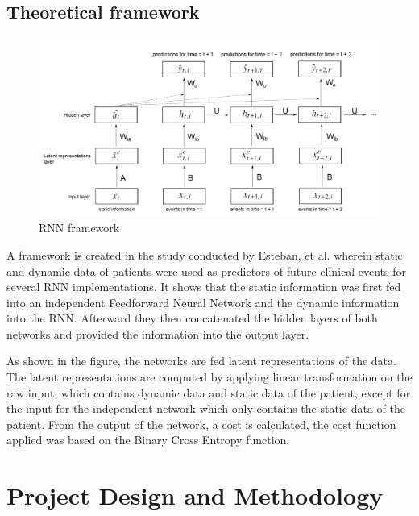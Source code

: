 \documentclass[10pt,11pt,12pt,oneside]{book}
\begin{document}
    \section{Theoretical framework}
    \begin{figure} [ht]
        \includegraphics[width=6.5in]{rnnframework.png}
        \caption{RNN framework}
        \medskip
    \end{figure}
    A framework is created in the study conducted by Esteban, et al. wherein static and dynamic data of patients were used as predictors of future clinical events for several RNN implementations. It shows that the static information was first fed into an independent Feedforward Neural Network and the dynamic information into the RNN. Afterward they then concatenated the hidden layers of both networks and provided the information into the output layer.
    
    As shown in the figure, the networks are fed latent representations of the data. The latent representations are computed by applying linear transformation on the raw input, which contains dynamic data and static data of the patient, except for the input for the independent network which only contains the static data of the patient. From the output of the network, a cost is calculated, the cost function applied was based on the Binary Cross Entropy function. \cite{DBLP:journals/corr/EstebanSYT16}
    \FloatBarrier
\chapter{Project Design and Methodology}
\end{document}

